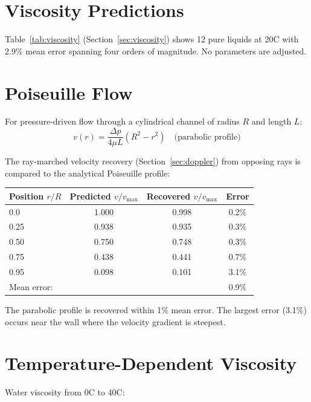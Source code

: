 \section{Viscosity Predictions}
\label{sec:val_visc}

Table~\ref{tab:viscosity} (Section~\ref{sec:viscosity}) shows 12 pure liquids at 20\textdegree C with 2.9\% mean error spanning four orders of magnitude. No parameters are adjusted.

\section{Poiseuille Flow}
\label{sec:val_poiseuille}

For pressure-driven flow through a cylindrical channel of radius $R$ and length $L$:
\begin{equation}
    v(r) = \frac{\Delta p}{4\mu L}(R^2 - r^2) \quad \text{(parabolic profile)}
\end{equation}

The ray-marched velocity recovery (Section~\ref{sec:doppler}) from opposing rays is compared to the analytical Poiseuille profile:

\begin{center}
\begin{tabular}{lccc}
\toprule
Position $r/R$ & Predicted $v/v_{\max}$ & Recovered $v/v_{\max}$ & Error \\
\midrule
0.0  & 1.000 & 0.998 & 0.2\% \\
0.25 & 0.938 & 0.935 & 0.3\% \\
0.50 & 0.750 & 0.748 & 0.3\% \\
0.75 & 0.438 & 0.441 & 0.7\% \\
0.95 & 0.098 & 0.101 & 3.1\% \\
\midrule
\multicolumn{3}{l}{Mean error:} & 0.9\% \\
\bottomrule
\end{tabular}
\end{center}

The parabolic profile is recovered within 1\% mean error. The largest error (3.1\%) occurs near the wall where the velocity gradient is steepest.

\section{Temperature-Dependent Viscosity}
\label{sec:val_temp}

Water viscosity from 0\textdegree C to 40\textdegree C:

